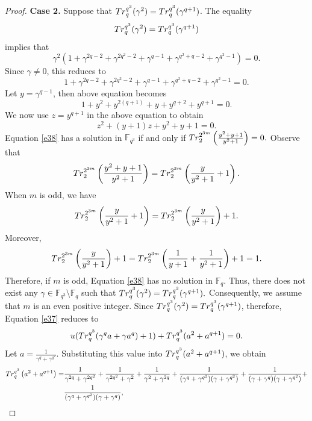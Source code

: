 \documentclass[10pt,a4paper]{amsart}
\def\Tr{{\rm Tr}}
\newcommand{\F}{\mathbb F}
\begin{document}
\begin{proof}
\textbf{Case 2.} Suppose that $\Tr_{q}^{q^3}(\gamma^2)=\Tr_{q}^{q^3}(\gamma^{q+1})$.  The equality  $$\Tr_{q}^{q^3}(\gamma^2)=\Tr_{q}^{q^3}(\gamma^{q+1})$$ implies that 
\begin{equation*}
    \gamma^2(1+\gamma^{2q-2}+\gamma^{2q^2-2}+\gamma^{q-1}+\gamma^{q^2+q-2}+\gamma^{q^2-1})=0.
\end{equation*}
Since $\gamma \neq 0$, this reduces to 
$$1+\gamma^{2q-2}+\gamma^{2q^2-2}+\gamma^{q-1}+\gamma^{q^2+q-2}+\gamma^{q^2-1}=0.$$
 Let $y=\gamma^{q-1}$, then above equation becomes 
 \begin{equation*}
     1+y^2+y^{2(q+1)}+y+y^{q+2}+y^{q+1}=0.
 \end{equation*}
 We now use $z=y^{q+1}$ in the above equation to obtain
 \begin{equation}\label{e38}
     z^2+(y+1)z+y^2+y+1=0.
 \end{equation}
Equation \eqref{e38} has a solution in $\F_{q^3}$ if and only if $\Tr_{2}^{2^{3m}}\left(\frac{y^2+y+1}{y^2+1}\right)=0.$ Observe that 
$$\Tr_{2}^{2^{3m}}\left(\frac{y^2+y+1}{y^2+1}\right)=\Tr_{2}^{2^{3m}}\left(\frac{y}{y^2+1}+1\right).$$
When $m$ is odd, we have
$$\Tr_{2}^{2^{3m}}\left(\frac{y}{y^2+1}+1\right)=\Tr_{2}^{2^{3m}}\left(\frac{y}{y^2+1}\right)+1.$$
Moreover, $$\Tr_{2}^{2^{3m}}\left(\frac{y}{y^2+1}\right)+1=\Tr_{2}^{2^{3m}}\left(\frac{1}{y+1}+\frac{1}{y^2+1}\right)+1=1.$$
Therefore, if $m$ is odd, Equation \eqref{e38} has no solution in $\F_q$. Thus, there does not exist any $\gamma \in \F_{q^3} \setminus \F_q$ such that $\Tr_{q}^{q^3}(\gamma^2)=\Tr_{q}^{q^3}(\gamma^{q+1}).$ Consequently, we assume that $m$ is an even positive integer. Since $\Tr_{q}^{q^3}(\gamma^2)=\Tr_{q}^{q^3}(\gamma^{q+1})$, therefore, Equation \eqref{e37} reduces to
\begin{equation}\label{e39}
    u(\Tr_{q}^{q^3}(\gamma^qa+\gamma a^q)+1)+\Tr_{q}^{q^3}(a^2+a^{q+1})=0.
\end{equation}
Let $a=\frac{1}{\gamma^q+\gamma^{q^2}}.$
Substituting this value into $\Tr_{q}^{q^3}(a^2+a^{q+1})$, we obtain 
\begin{equation*}
\begin{split}
\Tr_{q}^{q^3}\left(a^2+a^{q+1}\right)=&\frac{1}{\gamma^{2q}+\gamma^{2q^2}}+\frac{1}{\gamma^{2q^2}+\gamma^{2}}+\frac{1}{\gamma^{2}+\gamma^{2q}}+\frac{1}{(\gamma^{q}+\gamma^{q^2})(\gamma+\gamma^{q^2})}+\frac{1}{(\gamma+\gamma^{q})(\gamma+\gamma^{q^2})}+\\&\frac{1}{(\gamma^{q}+\gamma^{q^2})(\gamma+\gamma^{q})},
\end{split}

\end{equation*}
\end{proof}
\end{document}
